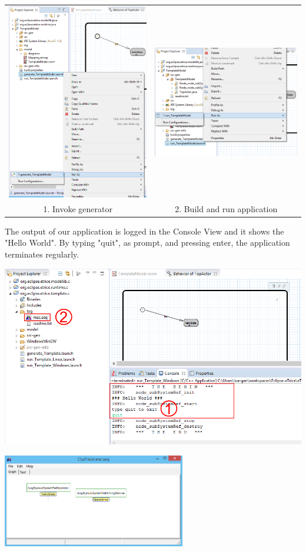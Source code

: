 \begin{tabular}{cc}
	\includegraphics[width=.45\textwidth]{images/014-generate.png} & 
	\includegraphics[width=.45\textwidth]{images/014-build_run.png} \\
	1. Invoke generator & 2. Build and run application
\end{tabular}

The output of our application is logged in the Console View and it shows the "Hello World". By typing "quit", as prompt, and pressing enter, the application terminates regularly.

\includegraphics[width=\textwidth]{images/013-quit-hello-msc.png}


\includegraphics[width=0.6\textwidth]{images/013-hello-msc.png}